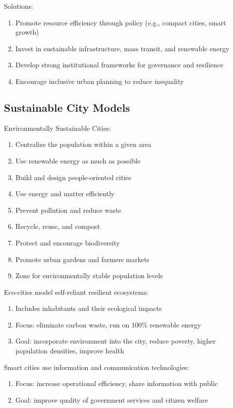\documentclass[12pt, a4paper]{article}
\begin{document}
\begin{multicols*}{3}
Solutions:
\begin{enumerate}[\roman*.]
  \item Promote resource efficiency through policy (e.g., compact cities, smart growth)
  \item Invest in sustainable infrastructure, mass transit, and renewable energy
  \item Develop strong institutional frameworks for governance and resilience
  \item Encourage inclusive urban planning to reduce inequality
\end{enumerate}

\colbreak
\subsection{Sustainable City Models}

Environmentally Sustainable Cities:
\begin{enumerate}[\roman*.]
  \item Centralize the population within a given area 
  \item Use renewable energy as much as possible 
  \item Build and design people-oriented cities 
  \item Use energy and matter efficiently 
  \item Prevent pollution and reduce waste 
  \item Recycle, reuse, and compost 
  \item Protect and encourage biodiversity 
  \item Promote urban gardens and farmers markets 
  \item Zone for environmentally stable population levels
\end{enumerate}

Eco-cities model self-reliant resilient ecosystems:
\begin{enumerate}[\roman*.]
  \item Includes inhabitants and their ecological impacts 
  \item Focus: eliminate carbon waste, run on 100\% renewable energy 
  \item Goal: incorporate environment into the city, reduce poverty, higher population densities, improve health
\end{enumerate}

Smart cities use information and communication technologies:
\begin{enumerate}[\roman*.]
  \item Focus: increase operational efficiency, share information with public
  \item Goal: improve quality of government services and citizen welfare
\end{enumerate}


\end{multicols*}
\end{document}
